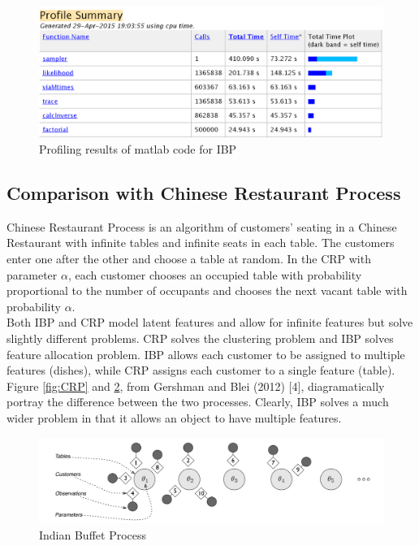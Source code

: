 \documentclass[11pt]{article}
\begin{document}
\begin{figure}
\includegraphics[width=\linewidth]{matlab_profile.png}
\caption {Profiling results of matlab code for IBP}
\label{fig:matlab}
\end{figure}

\subsection{Comparison with Chinese Restaurant Process}
Chinese Restaurant Process is an algorithm of customers’ seating in a Chinese Restaurant with infinite tables and infinite seats in each table. The customers enter one after the other and choose a table at random. In the CRP with parameter $\alpha$, each customer chooses an occupied table with probability proportional to the number of occupants and chooses the next vacant table with probability $\alpha$.\\

Both IBP and CRP model latent features and allow for infinite features but solve slightly different problems. CRP solves the clustering problem and IBP solves feature allocation problem. IBP allows each customer to be assigned to multiple features (dishes), while
CRP assigns each customer to a single feature (table). Figure \ref{fig:CRP} and \ref{fig:IBP}, from Gershman and Blei (2012) [4], diagramatically portray the difference between the two processes. Clearly, IBP solves a much wider problem in that it allows an object to have multiple features.

\begin{figure}
\includegraphics[width=\linewidth]{IBP.png}
\caption {Indian Buffet Process}
\label{fig:IBP}
\end{figure}
\end{document}
